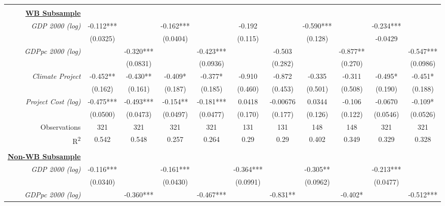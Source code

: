 \documentclass{article}
\begin{document}
\begin{singlespace}
\begin{landscape}
\begin{table}[H]
{\begin{tabular}{rcccccccccc}
					\multicolumn{1}{l}{} & \multicolumn{1}{l}{} & \multicolumn{1}{l}{} & \multicolumn{1}{l}{} & \multicolumn{1}{l}{} & \multicolumn{1}{l}{} & \multicolumn{1}{l}{} & \multicolumn{1}{l}{} & \multicolumn{1}{l}{} & \multicolumn{1}{l}{} & \multicolumn{1}{l}{} \\
					{\ul \textbf{WB Subsample}} &  &  &  &  &  &  &  &  &  &  \\
					\textit{GDP 2000 (log)} & -0.112*** &  & -0.162*** &  & -0.192 &  & -0.590*** &  & -0.234*** &  \\
					\textit{} & (0.0325) &  & (0.0404) &  & (0.115) &  & (0.128) &  & -0.0429 &  \\
					\textit{GDPpc 2000 (log)} &  & -0.320*** &  & -0.423*** &  & -0.503 &  & -0.877** &  & -0.547*** \\
					\textit{} &  & (0.0831) &  & (0.0936) &  & (0.282) &  & (0.270) &  & (0.0986) \\
					\textit{Climate Project} & -0.452** & -0.430** & -0.409* & -0.377* & -0.910 & -0.872 & -0.335 & -0.311 & -0.495* & -0.451* \\
					\textit{} & (0.162) & (0.161) & (0.187) & (0.185) & (0.460) & (0.453) & (0.501) & (0.508) & (0.190) & (0.188) \\
					\textit{Project Cost (log)} & -0.475*** & -0.493*** & -0.154** & -0.181*** & 0.0418 & -0.00676 & 0.0344 & -0.106 & -0.0670 & -0.109* \\
					\textit{} & (0.0500) & (0.0473) & (0.0497) & (0.0477) & (0.170) & (0.177) & (0.126) & (0.122) & (0.0546) & (0.0526) \\ \hline
					Observations & 321 & 321 & 321 & 321 & 131 & 131 & 148 & 148 & 321 & 321 \\
					R\textsuperscript{2} & 0.542 & 0.548 & 0.257 & 0.264 & 0.29 & 0.29 & 0.402 & 0.349 & 0.329 & 0.328 \\ \hline
					\multicolumn{1}{l}{\textit{}} & \multicolumn{1}{l}{} & \multicolumn{1}{l}{} & \multicolumn{1}{l}{} & \multicolumn{1}{l}{} & \multicolumn{1}{l}{} & \multicolumn{1}{l}{} & \multicolumn{1}{l}{} & \multicolumn{1}{l}{} & \multicolumn{1}{l}{} & \multicolumn{1}{l}{} \\
					{\ul \textbf{Non-WB Subsample}} &  &  &  &  &  &  &  &  &  &  \\
					\textit{GDP 2000 (log)} & -0.116*** &  & -0.161*** &  & -0.364*** &  & -0.305** &  & -0.213*** &  \\
					\textit{} & (0.0340) &  & (0.0430) &  & (0.0991) &  & (0.0962) &  & (0.0477) &  \\
					\textit{GDPpc 2000 (log)} &  & -0.360*** &  & -0.467*** &  & -0.831** &  & -0.402* &  & -0.512*** \\

\end{tabular}}
\end{table}
\end{landscape}
\end{singlespace}
\end{document}
